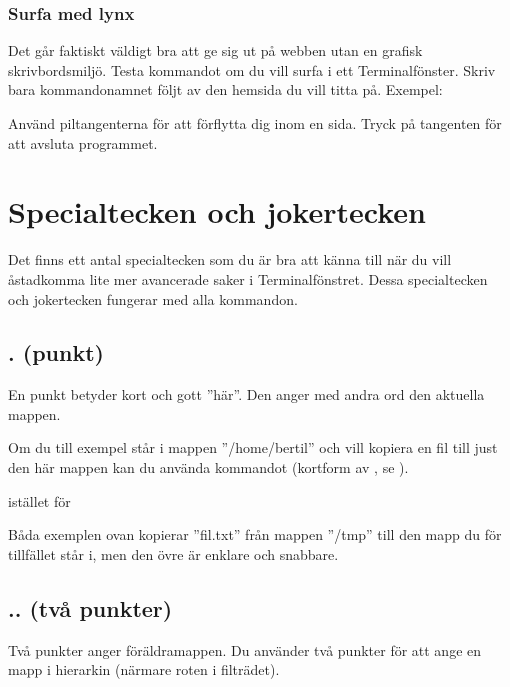 \documentclass[a4paper,final]{memoir} %
\begin{document}
\subsubsection{Surfa med lynx} 


Det går faktiskt väldigt bra att ge sig ut på webben utan en grafisk skrivbordsmiljö. Testa kommandot  om du vill surfa i ett Terminalfönster. Skriv bara kommandonamnet följt av den hemsida du vill titta på. Exempel:


Använd piltangenterna för att förflytta dig inom en sida. Tryck på tangenten  för att avsluta programmet.

\section{Specialtecken och jokertecken}\label{sec:joker} 

Det finns ett antal specialtecken som du är bra att känna till när du vill åstadkomma lite mer avancerade saker i Terminalfönstret. Dessa specialtecken och jokertecken fungerar med alla kommandon.

\subsection{. (punkt)}

En punkt betyder kort och gott ''här''. Den anger med andra ord den aktuella mappen.

Om du till exempel står i mappen ''/home/bertil'' och vill kopiera en fil till just den här mappen kan du använda kommandot  (kortform av , se ).


istället för


Båda exemplen ovan kopierar ''fil.txt'' från mappen ''/tmp'' till den mapp du för tillfället står i, men den övre är enklare och snabbare.

\subsection{.. (två punkter)}

Två punkter anger föräldramappen. Du använder två punkter för att ange en mapp i hierarkin (närmare roten i filträdet). 
\end{document}
